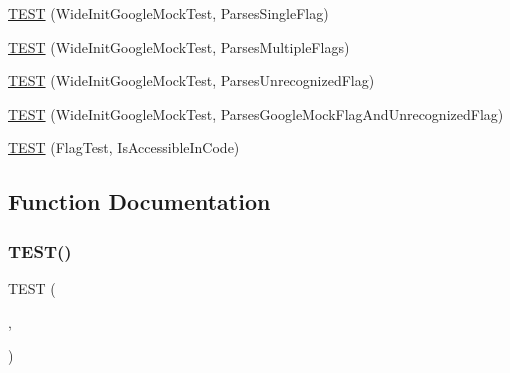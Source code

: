 \begin{DoxyCompactItemize}
\item 
\mbox{\hyperlink{_obj__test_2lib_2googletest-master_2googlemock_2test_2gmock__test_8cc_ab4288bcdb1b8464596f24c7384c72eb4}{T\+E\+ST}} (Wide\+Init\+Google\+Mock\+Test, Parses\+Single\+Flag)
\item 
\mbox{\hyperlink{_obj__test_2lib_2googletest-master_2googlemock_2test_2gmock__test_8cc_a00a9cde83573de9c598297cb89020e69}{T\+E\+ST}} (Wide\+Init\+Google\+Mock\+Test, Parses\+Multiple\+Flags)
\item 
\mbox{\hyperlink{_obj__test_2lib_2googletest-master_2googlemock_2test_2gmock__test_8cc_a29f97c351b2c31a05b34d7c63bb06392}{T\+E\+ST}} (Wide\+Init\+Google\+Mock\+Test, Parses\+Unrecognized\+Flag)
\item 
\mbox{\hyperlink{_obj__test_2lib_2googletest-master_2googlemock_2test_2gmock__test_8cc_a6d85c181697be8603091b049564cf5c6}{T\+E\+ST}} (Wide\+Init\+Google\+Mock\+Test, Parses\+Google\+Mock\+Flag\+And\+Unrecognized\+Flag)
\item 
\mbox{\hyperlink{_obj__test_2lib_2googletest-master_2googlemock_2test_2gmock__test_8cc_a737c00dcd21d5b1ef3d9299cab7a51d3}{T\+E\+ST}} (Flag\+Test, Is\+Accessible\+In\+Code)
\end{DoxyCompactItemize}


\subsection{Function Documentation}
\mbox{\label{_obj__test_2lib_2googletest-master_2googlemock_2test_2gmock__test_8cc_a7c86c6c98b72e903135c1b01370a13f3}} 
\subsubsection{\texorpdfstring{TEST()}{TEST()}\hspace{0.1cm}{\footnotesize\ttfamily [1/13]}}
{\footnotesize\ttfamily T\+E\+ST (\begin{DoxyParamCaption}\item[{Init\+Google\+Mock\+Test}]{,  }\item[{Parses\+Invalid\+Command\+Line}]{ }\end{DoxyParamCaption})}

\mbox{\label{_obj__test_2lib_2googletest-master_2googlemock_2test_2gmock__test_8cc_a29b51be89eb52fa64713438ecf4ab924}} 
